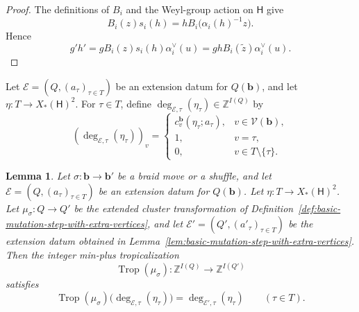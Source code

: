 \documentclass[10pt,a4paper]{article}
\newtheorem{lemma}[theorem]{Lemma}
\theoremstyle{definition}
\theoremstyle{remark}
\newcommand{\torusH}{\mathsf{H}}
\newcommand{\Vcal}{\mathcal V}
\begin{document}
\begin{proof}
The definitions of \(B_i\) and the Weyl-group action on \(\torusH\) give
\[
 B_i(z)s_i(h)=hB_i\bigl(\alpha_i(h)^{-1}z\bigr).
\]
Hence
\[
 g'h'
 =gB_i(z)s_i(h)\alpha_i^\vee(u)
 =ghB_i(\widetilde z)\alpha_i^\vee(u).
\]
\end{proof}

Let \(\mathcal E=(Q,(a_\tau)_{\tau\in T})\) be an extension datum for
\(Q(\mathbf b)\), and let \(\eta:T\to X_*(\torusH)^2\).  For
\(\tau\in T\), define
\(\deg_{\mathcal E,\tau}(\eta_\tau)\in\mathbb Z^{I(Q)}\) by
\[
 (\deg_{\mathcal E,\tau}(\eta_\tau))_v
 =\begin{cases}
 c_v^{\mathbf b}(\eta_\tau;a_\tau),&v\in\Vcal(\mathbf b),\\
 1,&v=\tau,\\
 0,&v\in T\setminus\{\tau\}.
 \end{cases}
\]

\begin{lemma}
\label{lem:cartan-degree-tropical-transport}
Let \(\sigma:\mathbf b\to\mathbf b'\) be a braid move or a shuffle, and let
\(\mathcal E=(Q,(a_\tau)_{\tau\in T})\) be an extension datum for
\(Q(\mathbf b)\).  Let \(\eta:T\to X_*(\torusH)^2\).  Let
\(\mu_\sigma:Q\to Q'\) be the extended cluster
transformation of Definition~\ref{def:basic-mutation-step-with-extra-vertices},
and let \(\mathcal E'=(Q',(a'_\tau)_{\tau\in T})\) be the extension datum
obtained in Lemma~\ref{lem:basic-mutation-step-with-extra-vertices}.  Then the
integer min-plus tropicalization
\[
 \operatorname{Trop}(\mu_\sigma):
 \mathbb Z^{I(Q)}\longrightarrow\mathbb Z^{I(Q')}
\]
satisfies
\begin{equation}
 \operatorname{Trop}(\mu_\sigma)
 \bigl(\deg_{\mathcal E,\tau}(\eta_\tau)\bigr)
 =\deg_{\mathcal E',\tau}(\eta_\tau)
 \qquad(\tau\in T).
 \label{eq:cartan-degree-tropical-transport}
\end{equation}
\end{lemma}
\end{document}
